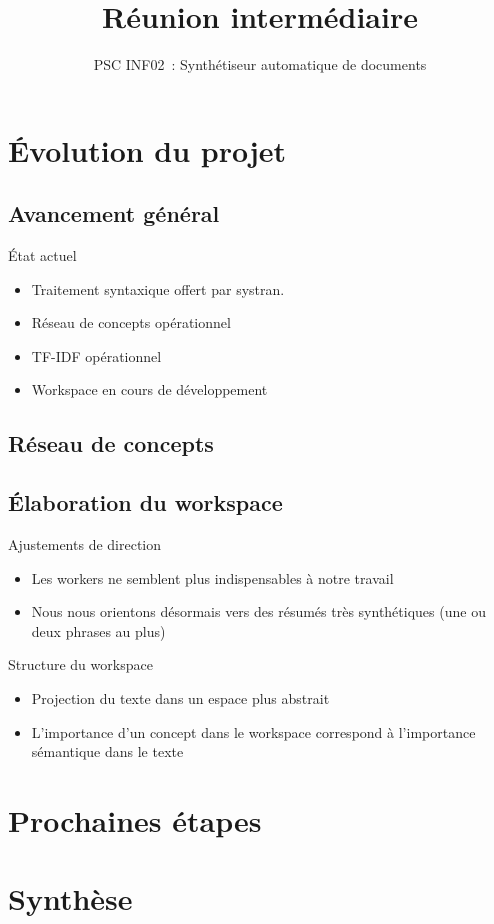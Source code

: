 \documentclass{beamer}
\title{Réunion intermédiaire}
\subtitle{PSC INF02~: Synthétiseur automatique de documents}
\author{}
\institute{École polytechnique}
\date{}
\begin{document}
\beamertemplatenavigationsymbolsempty{}
\beamerdefaultoverlayspecification{<+->}
\begin{frame}
  \titlepage{}
\end{frame}

\section{Évolution du projet}
\subsection{Avancement général}

\begin{frame}
  \begin{block}{État actuel}
    \begin{itemize}
      \item Traitement syntaxique offert par systran.
      \item Réseau de concepts opérationnel
      \item TF-IDF opérationnel
      \item Workspace en cours de développement
    \end{itemize}
  \end{block}
\end{frame}

\subsection{Réseau de concepts}
\begin{frame}

\end{frame}

\subsection{Élaboration du workspace}
\begin{frame}
  \begin{block}{Ajustements de direction}
    \begin{itemize}
      \item Les workers ne semblent plus indispensables à notre travail
      \item Nous nous orientons désormais vers des résumés très synthétiques (une ou deux phrases au plus)
    \end{itemize}
  \end{block}

  \begin{block}{Structure du workspace}
   \begin{itemize}
     \item Projection du texte dans un espace plus abstrait
     \item L'importance d'un concept dans le workspace correspond à l'importance sémantique dans le texte
   \end{itemize} 
  \end{block}
\end{frame}

\section{Prochaines étapes}

\section{Synthèse}
\end{document}
